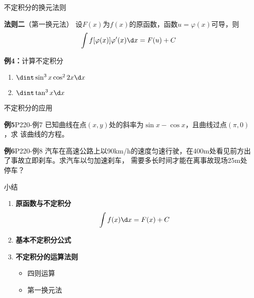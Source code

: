 \begin{frame}{不定积分的换元法则}
	\linespread{1.2}
	\begin{block}{\alert{{\bf 法则二}（第一换元法）}}
		设$F(x)$为$f(x)$的原函数，函数$u=\varphi(x)$可导，则
		$$\int f[\varphi(x)]\varphi'(x)\d x=F(u)+C$$
	\end{block}\pause 
	\begin{exampleblock}{{\bf 例4：}计算不定积分}
		\begin{enumerate}\pause 
		  \item $\dint \sin^3x\cos^22x\d x$\pause 
		  \item $\dint \tan^3x\d x$
		\end{enumerate}
	\end{exampleblock}
\end{frame}

\begin{frame}{不定积分的应用}
	\linespread{1.2}
	\begin{exampleblock}{{\bf 例5}\hfill P220-例7}
		已知曲线在点$(x,y)$处的斜率为$\sin x-\cos x$，且曲线过点$(\pi,0)$，求
		该曲线的方程。
	\end{exampleblock}
	\bigskip
	\pause 
	\begin{exampleblock}{{\bf 例6}\hfill P220-例8}
		汽车在高速公路上以90km/h的速度匀速行驶，在400m处看见前方出了事故立即刹车。求汽车以匀加速刹车，
		需要多长时间才能在离事故现场25m处停车？
	\end{exampleblock}
\end{frame}

\begin{frame}[<+->]{小结}
	\linespread{1.5}
	\begin{enumerate}
	  \item {\bf 原函数与不定积分}
	  $$\int f(x)\d x=F(x)+C$$
	  \item {\bf 基本不定积分公式}
	  \item {\bf 不定积分的运算法则}
	  \begin{itemize}
	    \item 四则运算
	    \item 第一换元法
	  \end{itemize}
	\end{enumerate}
\end{frame}



